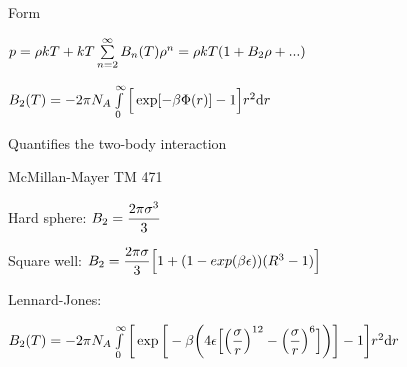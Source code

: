 \begin{bigmdframed}

    
\begin{listone}
    
    \item Form
    
    \begin{listtwo}
    
    	\item $p = \dens\thermcond\Temp + \thermcond\Temp\sum\limits_{n=2}^\infty\virialcoeff{n}(\Temp)\dens^{n} = \dens\thermcond\Temp(1+\virialcoeff{2}\dens+...)$     %
    
    	\item $\virialcoeff{2}(\Temp) = -2\pie\massspecflux{\helmholtz}\int\limits_{0}^{\infty}\Big[\exp[-\boltznorm\pot(\pos)]-1\Big]\pos^2\mathrm{d}\pos$     %
    
    	\begin{listthree}
    
    		\item Quantifies the two-body interaction
            
            \begin{listfour}
    
    			\item McMillan-Mayer TM 471

			\end{listfour}

    		\item Hard sphere: $\virialcoeff{2} = \dfrac{2\pie\molecrad^3}{3}$
    
    		\item Square well: $\virialcoeff{2} = \dfrac{2\pie\molecrad}{3}\Big[1+(1-exp(\boltznorm\dielec))(\gasconst^3-1)\Big] $

    		\item Lennard-Jones:
            
            \begin{listfour}
    
    			\item $\virialcoeff{2}(\Temp) = -2\pie\massspecflux{\helmholtz}\int\limits_{0}^{\infty}\bigg[\exp\bigg[-\boltznorm\bigg(4\dielec\Big[\Big(\dfrac{\molecrad}{\pos}\Big)^{12}-\Big(\dfrac{\molecrad}{\pos}\Big)^6\Big]\bigg)\bigg]-1\bigg]\pos^2\mathrm{d}\pos$
    
    		\end{listfour}
    
    	\end{listthree}
    
    \end{listtwo}
    
\end{listone}
    
\end{bigmdframed}